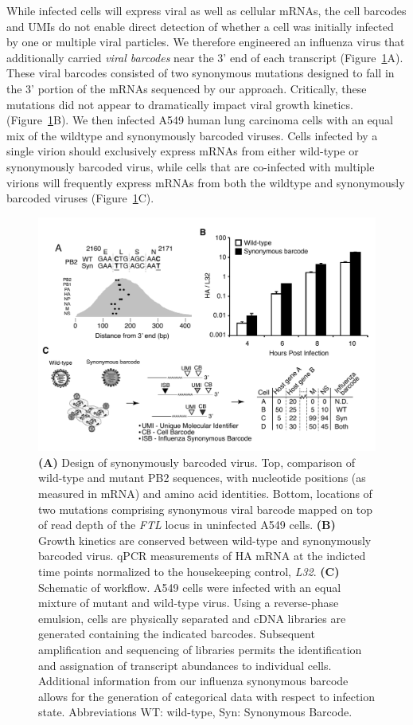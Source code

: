 \documentclass[9pt,lineno]{elife}
\begin{document}
While infected cells will express viral as well as cellular mRNAs, the cell barcodes and UMIs do not enable direct detection of whether a cell was initially infected by one or multiple viral particles.
We therefore engineered an influenza virus that additionally carried \emph{viral barcodes} near the 3' end of each transcript (Figure~\ref{fig:workflow}A).
These viral barcodes consisted of two synonymous mutations designed to fall in the 3' portion of the mRNAs sequenced by our approach.
Critically, these mutations did not appear to dramatically impact viral growth kinetics. (Figure~\ref{fig:workflow}B).
We then infected A549 human lung carcinoma cells with an equal mix of the wildtype and synonymously barcoded viruses.
Cells infected by a single virion should exclusively express mRNAs from either wild-type or synonymously barcoded virus, while cells that are co-infected with multiple virions will frequently express mRNAs from both the wildtype and synonymously barcoded viruses (Figure~\ref{fig:workflow}C).
\begin{figure}
\includegraphics[width=0.8\linewidth]{figures/Workflow/workflow.pdf}
\caption{\label{fig:workflow}
{\bf (A)}  Design of synonymously barcoded virus. Top, comparison of wild-type and mutant PB2 sequences, with nucleotide positions (as measured in mRNA) and amino acid identities. Bottom, locations of two mutations comprising synonymous viral barcode mapped on top of read depth of the \emph{FTL} locus in uninfected A549 cells.
{\bf (B)} Growth kinetics are conserved between wild-type and synonymously barcoded virus. qPCR measurements of HA mRNA at the indicted time points normalized to the housekeeping control, \emph{L32}.
{\bf (C)}  Schematic of workflow. A549 cells were infected with an equal mixture of mutant and wild-type virus. Using a reverse-phase emulsion, cells are physically separated and cDNA libraries are generated containing the indicated barcodes. Subsequent amplification and sequencing of libraries permits the identification and assignation of transcript abundances to individual cells. Additional information from our influenza synonymous barcode allows for the generation of categorical data with respect to infection state. Abbreviations WT: wild-type, Syn: Synonymous Barcode.
}
\end{figure}
\end{document}
